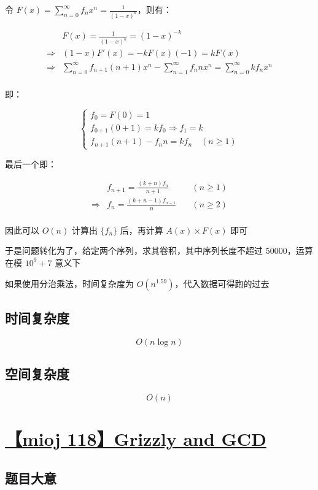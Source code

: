 \documentclass[UTF8]{article}
\begin{document}
令 $F(x)=\sum_{n=0}^{\infty}f_nx^n=\frac{1}{(1-x)^k}$，则有：

$$
\begin{aligned}
&F(x)=\frac{1}{(1-x)^k}=(1-x)^{-k} \\
\Rightarrow &(1-x)F'(x)=-kF(x)(-1)=kF(x) \\
\Rightarrow &\sum_{n=0}^{\infty}f_{n+1}(n+1)x^n-\sum_{n=1}^{\infty}f_nnx^n=\sum_{n=0}^{\infty}kf_nx^n \\
\end{aligned}
$$

即：

$$
\begin{cases}
f_0=F(0)=1 \\
f_{0+1}(0+1)=kf_0 \Rightarrow f_1=k \\
f_{n+1}(n+1)-f_{n}n=kf_n \quad (n \ge 1)
\end{cases}
$$

最后一个即：

$$
\begin{aligned}
&f_{n+1}=\frac{(k+n)f_n}{n+1} \quad & (n \ge 1) \\
\Rightarrow &f_{n}=\frac{(k+n-1)f_{n-1}}{n} \quad & (n \ge 2) \\
\end{aligned}
$$

因此可以 $O(n)$ 计算出 $\{f_n\}$ 后，再计算 $A(x) \times F(x)$ 即可

于是问题转化为了，给定两个序列，求其卷积，其中序列长度不超过 $50000$，运算在模 $10^9+7$ 意义下

如果使用分治乘法，时间复杂度为 $O(n^{1.59})$，代入数据可得跑的过去

\subsection{时间复杂度}

$$
O(n \log n)
$$

\subsection{空间复杂度}

$$
O(n)
$$

\section{\href{https://code.mi.com/problem/list/view?id=118}{【mioj 118】Grizzly and GCD}}

\subsection{题目大意}
\end{document}
